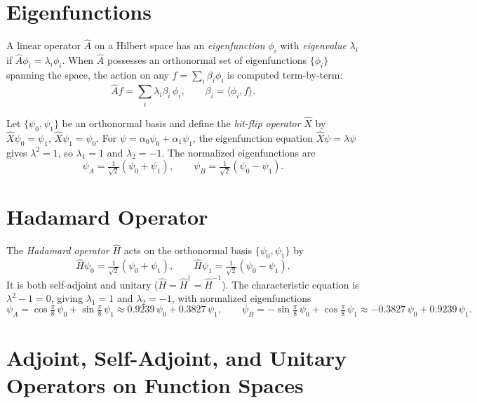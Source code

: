 \section{Eigenfunctions}

A linear operator $\hat{A}$ on a Hilbert space has an \emph{eigenfunction} $\phi_i$ with \emph{eigenvalue} $\lambda_i$ if $\hat{A}\phi_i=\lambda_i\phi_i$. When $\hat{A}$ possesses an orthonormal set of eigenfunctions $\{\phi_i\}$ spanning the space, the action on any $f=\sum_i\beta_i\phi_i$ is computed term-by-term:
\[
  \hat{A}f = \sum_i \lambda_i\beta_i\,\phi_i, \qquad \beta_i=\langle\phi_i,f\rangle.
\]

\begin{example}
Let $\{\psi_0,\psi_1\}$ be an orthonormal basis and define the \emph{bit-flip operator} $\hat{X}$ by $\hat{X}\psi_0=\psi_1$, $\hat{X}\psi_1=\psi_0$. For $\psi=\alpha_0\psi_0+\alpha_1\psi_1$, the eigenfunction equation $\hat{X}\psi=\lambda\psi$ gives $\lambda^2=1$, so $\lambda_1=1$ and $\lambda_2=-1$. The normalized eigenfunctions are
\[
  \psi_A = \tfrac{1}{\sqrt{2}}(\psi_0+\psi_1),\qquad \psi_B = \tfrac{1}{\sqrt{2}}(\psi_0-\psi_1).
\]
\end{example}

\section{Hadamard Operator}

The \emph{Hadamard operator} $\hat{H}$ acts on the orthonormal basis $\{\psi_0,\psi_1\}$ by
\[
  \hat{H}\psi_0 = \tfrac{1}{\sqrt{2}}(\psi_0+\psi_1),\qquad
  \hat{H}\psi_1 = \tfrac{1}{\sqrt{2}}(\psi_0-\psi_1).
\]
It is both self-adjoint and unitary ($\hat{H}=\hat{H}^\dagger=\hat{H}^{-1}$). The characteristic equation is $\lambda^2-1=0$, giving $\lambda_1=1$ and $\lambda_2=-1$, with normalized eigenfunctions
\[
  \psi_A = \cos\tfrac{\pi}{8}\,\psi_0+\sin\tfrac{\pi}{8}\,\psi_1
         \approx 0.9239\,\psi_0+0.3827\,\psi_1,\qquad
  \psi_B = -\sin\tfrac{\pi}{8}\,\psi_0+\cos\tfrac{\pi}{8}\,\psi_1
         \approx -0.3827\,\psi_0+0.9239\,\psi_1.
\]

\section{Adjoint, Self-Adjoint, and Unitary Operators on Function Spaces}
\label{sec:func-adjoint}

